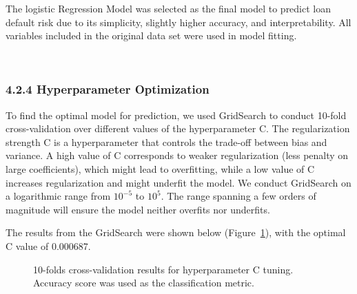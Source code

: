 \documentclass[
  letterpaper,
  DIV=11,
  numbers=noendperiod]{scrartcl}
\begin{document}
The logistic Regression Model was selected as the final model to predict
loan default risk due to its simplicity, slightly higher accuracy, and
interpretability. All variables included in the original data set were
used in model fitting.

~ ~

\subsubsection{4.2.4 Hyperparameter
Optimization}\label{hyperparameter-optimization}

To find the optimal model for prediction, we used GridSearch to conduct
10-fold cross-validation over different values of the hyperparameter C.
The regularization strength C is a hyperparameter that controls the
trade-off between bias and variance. A high value of C corresponds to
weaker regularization (less penalty on large coefficients), which might
lead to overfitting, while a low value of C increases regularization and
might underfit the model. We conduct GridSearch on a logarithmic range
from \(10^{-5}\) to \(10^{5}\). The range spanning a few orders of
magnitude will ensure the model neither overfits nor underfits.

The results from the GridSearch were shown below
(Figure~\ref{fig-C_tuning}), with the optimal C value of 0.000687.

\begin{figure}


\caption{\label{fig-C_tuning}10-folds cross-validation results for
hyperparameter C tuning. Accuracy score was used as the classification
metric.}

\end{figure}%
\end{document}
